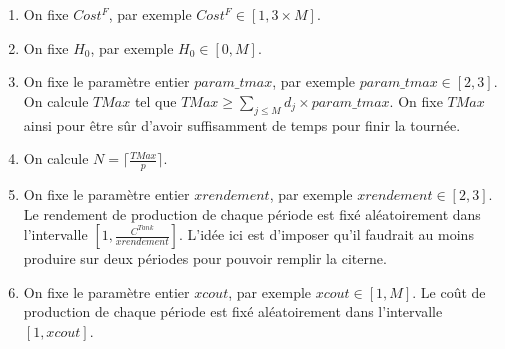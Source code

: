{\begin{enumerate}
	\item On fixe $Cost^F$, par exemple $Cost^F \in [1, 3\times M]$.  
	\item On fixe $H_0$, par exemple $H_0 \in [0, M]$. %
	\item On fixe le paramètre entier $param\_tmax$, par exemple $param\_tmax\in [2,3]$. On calcule $TMax$ tel que $TMax \geq \sum_{j \leq M} d_j \times param\_tmax$. On fixe $TMax$ ainsi pour être sûr d'avoir suffisamment de temps pour finir la tournée.
	\item On calcule $N=\lceil \frac{TMax}{p}\rceil$.%
	\item On fixe le paramètre entier $xrendement$, par exemple $xrendement \in [2,3]$. Le rendement de production de chaque période est fixé aléatoirement dans l'intervalle $[1, \frac{C^{Tank}}{xrendement}]$. L'idée ici est d'imposer qu'il faudrait au moins produire sur deux périodes pour pouvoir remplir la citerne.
	\item On fixe le paramètre entier $xcout$, par exemple $xcout \in [1, M]$. Le coût de production de chaque période est fixé aléatoirement dans l'intervalle $[1, xcout]$.
\end{enumerate}





}
